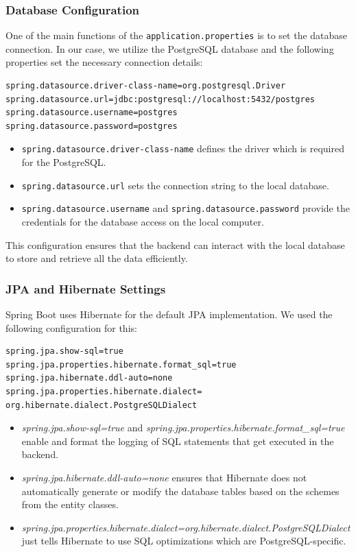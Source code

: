         \subsubsection{Database Configuration}
        One of the main functions of the \texttt{application.properties} is to set the database connection. In our case, we utilize the PostgreSQL database and the following properties set the necessary connection details:
        
        \begin{verbatim}
spring.datasource.driver-class-name=org.postgresql.Driver
spring.datasource.url=jdbc:postgresql://localhost:5432/postgres
spring.datasource.username=postgres
spring.datasource.password=postgres
        \end{verbatim}
        \begin{itemize}
            \item \texttt{spring.datasource.driver-class-name} defines the driver which is required for the PostgreSQL.
            \item \texttt{spring.datasource.url} sets the connection string to the local database.
            \item \texttt{spring.datasource.username} and \texttt{spring.datasource.password} provide the credentials for the database access on the local computer.
        \end{itemize}
        This configuration ensures that the backend can interact with the local database to store and retrieve all the data efficiently.

        \subsubsection{JPA and Hibernate Settings}
        Spring Boot uses Hibernate for the default JPA implementation. We used the following configuration for this:

        \begin{verbatim}
spring.jpa.show-sql=true
spring.jpa.properties.hibernate.format_sql=true
spring.jpa.hibernate.ddl-auto=none
spring.jpa.properties.hibernate.dialect= org.hibernate.dialect.PostgreSQLDialect
        \end{verbatim} 
        
        \begin{itemize}
            \item \textit{spring.jpa.show-sql=true} and \textit{spring.jpa.properties.hibernate.format\_sql=true} enable and format the logging of SQL statements that get executed in the backend.
            \item \textit{spring.jpa.hibernate.ddl-auto=none} ensures that Hibernate does not automatically generate or modify the database tables based on the schemes from the entity classes.
            \item \textit{spring.jpa.properties.hibernate.dialect=org.hibernate.dialect.PostgreSQLDialect} just tells Hibernate to use SQL optimizations which are PostgreSQL-specific.
        \end{itemize}
        

